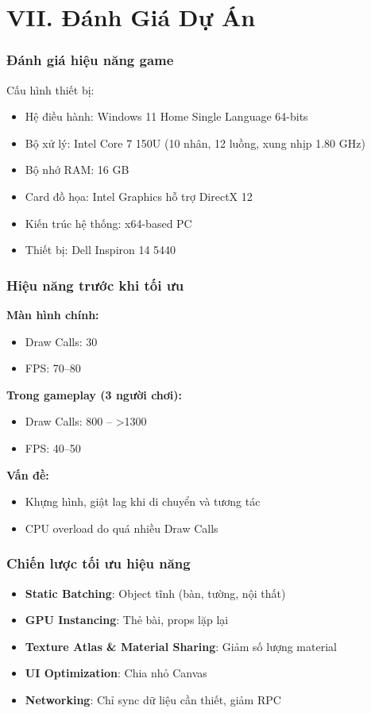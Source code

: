 \section{VII. Đánh Giá Dự Án}

\begin{frame}
\frametitle{Đánh giá hiệu năng game}
    Cấu hình thiết bị:
    \begin{itemize}
        \item Hệ điều hành: Windows 11 Home Single Language 64-bits
        \item Bộ xử lý: Intel Core 7 150U (10 nhân, 12 luồng, xung nhịp 1.80 GHz)
        \item Bộ nhớ RAM: 16 GB
        \item Card đồ họa: Intel Graphics hỗ trợ DirectX 12
        \item Kiến trúc hệ thống: x64-based PC
        \item Thiết bị: Dell Inspiron 14 5440
    \end{itemize}
\end{frame}

\begin{frame}
\frametitle{Hiệu năng trước khi tối ưu}

    \textbf{Màn hình chính:}
    \begin{itemize}
        \item Draw Calls: 30
        \item FPS: 70--80
    \end{itemize}

    \textbf{Trong gameplay (3 người chơi):}
    \begin{itemize}
        \item Draw Calls: 800 -- >1300
        \item FPS: 40--50
    \end{itemize}

    \textbf{Vấn đề:}
    \begin{itemize}
        \item Khựng hình, giật lag khi di chuyển và tương tác
        \item CPU overload do quá nhiều Draw Calls
    \end{itemize}
\end{frame}

\begin{frame}
\frametitle{Chiến lược tối ưu hiệu năng}

    \begin{itemize}
        \item \textbf{Static Batching}: Object tĩnh (bàn, tường, nội thất)
        \item \textbf{GPU Instancing}: Thẻ bài, props lặp lại
        \item \textbf{Texture Atlas \& Material Sharing}: Giảm số lượng material
        \item \textbf{UI Optimization}: Chia nhỏ Canvas
        \item \textbf{Networking}: Chỉ sync dữ liệu cần thiết, giảm RPC
    \end{itemize}
\end{frame}


